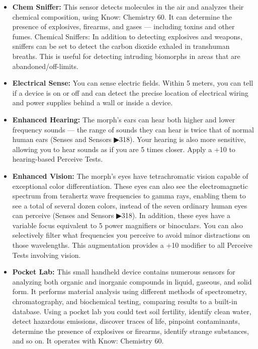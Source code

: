 \begin{itemize}
    \item \textbf{Chem Sniffer:} This sensor detects molecules in the air and analyzes their chemical composition, using Know: Chemistry 60. It can determine the presence of explosives, firearms, and gases — including toxins and other fumes. Chemical Sniffers: In addition to detecting explosives and weapons, sniffers can be set to detect the carbon dioxide exhaled in transhuman breaths. This is useful for detecting intruding biomorphs in areas that are abandoned/off-limits. \citep[pg. 318, 373]{ep2e_1.1_2019}

    \item \textbf{Electrical Sense:} You can sense electric fields. Within 5 meters, you can tell if a device is on or off and can detect the precise location of electrical wiring and power supplies behind a wall or inside a device. \citep[pg. 318]{ep2e_1.1_2019}

    \item \textbf{Enhanced Hearing:} The morph’s ears can hear both higher and lower frequency sounds — the range of sounds they can hear is twice that of normal human ears (Senses and Sensors ▶318). Your hearing is also more sensitive, allowing you to hear sounds as if you are 5 times closer. Apply a +10 to hearing-based Perceive Tests. \citep[pg. 318]{ep2e_1.1_2019}

    \item \textbf{Enhanced Vision:} The morph’s eyes have tetrachromatic vision capable of exceptional color differentiation. These eyes can also see the electromagnetic spectrum from terahertz wave frequencies to gamma rays, enabling them to see a total of several dozen colors, instead of the seven ordinary human eyes can perceive (Senses and Sensors ▶318). In addition, these eyes have a variable focus equivalent to 5 power magnifiers or binoculars. You can also selectively filter what frequencies you perceive to avoid minor distractions on those wavelengths. This augmentation provides a +10 modifier to all Perceive Tests involving vision.  \citep[pg. 318]{ep2e_1.1_2019}

    \item \textbf{Pocket Lab:} This small handheld device contains numerous sensors for analyzing both organic and inorganic compounds in liquid, gaseous, and solid form. It performs material analysis using different methods of spectrometry, chromatography, and biochemical testing, comparing results to a built-in database. Using a pocket lab you could test soil fertility, identify clean water, detect hazardous emissions, discover traces of life, pinpoint contaminants, determine the presence of explosives or firearms, identify strange substances, and so on. It operates with Know: Chemistry 60. \citep[pg. 340]{ep2e_1.1_2019}


\end{itemize}
